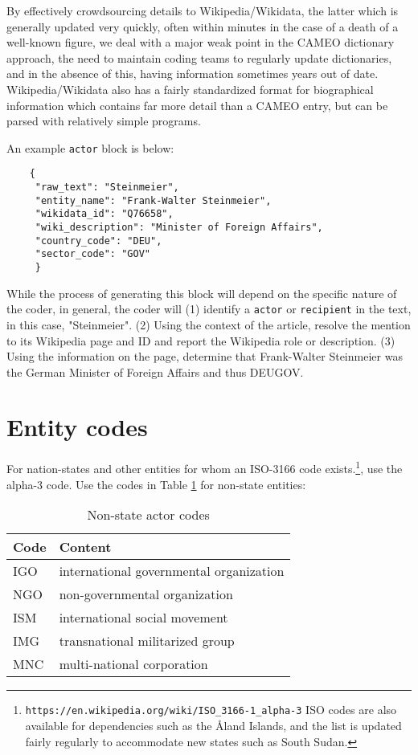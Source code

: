 \documentclass[11pt]{report}
\newcommand{\txt}[1]{\texttt{#1}}
\newcommand{\fn}[1]{\footnote{#1}}
\begin{document}
By effectively crowdsourcing details to Wikipedia/Wikidata, the latter which is generally updated very quickly, often within minutes in the case of a death of a well-known figure, we deal with a major weak point in the CAMEO dictionary approach,  the need to maintain coding teams to regularly update dictionaries, and in the absence of this, having information sometimes years out of date. Wikipedia/Wikidata also has a fairly standardized format for biographical information which contains far more detail than a CAMEO entry, but can be parsed with relatively simple programs.

An example \txt{actor} block is below:

\begin{verbatim}
	{
	 "raw_text": "Steinmeier",
	 "entity_name": "Frank-Walter Steinmeier",
	 "wikidata_id": "Q76658",
	 "wiki_description": "Minister of Foreign Affairs",
	 "country_code": "DEU",
	 "sector_code": "GOV"
	 }
\end{verbatim}

While the process of generating this block will depend on the specific nature of the coder, in general, the coder will (1) identify a  \txt{actor} or \txt{recipient} in the text, in this case, "Steinmeier". (2) Using the context of the article, resolve the mention to its Wikipedia page and ID and report the Wikipedia role or description. (3) Using the information on the page, determine that Frank-Walter Steinmeier was the German Minister of Foreign Affairs and thus DEUGOV.


\section{Entity codes}

For nation-states and other entities for whom an ISO-3166 code exists.\fn{\txt{https://en.wikipedia.org/wiki/ISO\_3166-1\_alpha-3} ISO codes are also available for dependencies such as the \AA land Islands, and the list is updated fairly regularly to accommodate new states such as South Sudan.}, use the alpha-3 code. Use the codes in Table \ref{tab:nonstate} for non-state entities:

\begin{table}[htp]
\caption{Non-state actor codes}
\begin{center}
\begin{tabular}{|l|l|}
\hline
Code & Content \\
\hline
IGO   &   international governmental organization\\
NGO &   non-governmental organization\\
ISM           &   international social movement\\
IMG            &   transnational militarized group\\
MNC            &   multi-national corporation\\
\hline
\end{tabular}
\end{center}
\label{tab:nonstate}
\end{table}%
\end{document}
